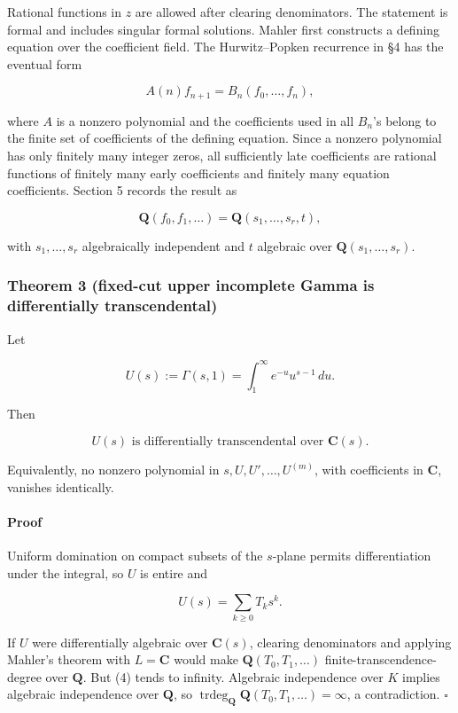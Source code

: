 Rational functions in \(z\) are allowed after clearing denominators. The
statement is formal and includes singular formal solutions. Mahler first
constructs a defining equation over the coefficient field. The
Hurwitz--Popken recurrence in §4 has the eventual form

\[
 A(n)f_{n+1}=B_n(f_0,\ldots,f_n),                                           \tag{GT-6}
\]

where \(A\) is a nonzero polynomial and the coefficients used in all
\(B_n\)'s belong to the finite set of coefficients of the defining equation.
Since a nonzero polynomial has only finitely many integer zeros, all
sufficiently late coefficients are rational functions of finitely many early
coefficients and finitely many equation coefficients. Section 5 records the
result as

\[
 \mathbf Q(f_0,f_1,\ldots)=\mathbf Q(s_1,\ldots,s_r,t),
\]

with \(s_1,\ldots,s_r\) algebraically independent and \(t\) algebraic over
\(\mathbf Q(s_1,\ldots,s_r)\).

\subsubsection{Theorem 3 (fixed-cut upper incomplete Gamma is differentially transcendental)}

Let

\[
 U(s):=\Gamma(s,1)=\int_1^\infty e^{-u}u^{s-1}\,du .
\]

Then

\[
 \boxed{U(s)\text{ is differentially transcendental over }\mathbf C(s).}    \tag{GT-7}
\]

Equivalently, no nonzero polynomial in \(s,U,U',\ldots,U^{(m)}\), with
coefficients in \(\mathbf C\), vanishes identically.

\paragraph{Proof}

Uniform domination on compact subsets of the \(s\)-plane permits
differentiation under the integral, so \(U\) is entire and

\[
 U(s)=\sum_{k\ge0}T_ks^k.                                                   \tag{GT-8}
\]

If \(U\) were differentially algebraic over \(\mathbf C(s)\), clearing
denominators and applying Mahler's theorem with \(L=\mathbf C\) would make
\(\mathbf Q(T_0,T_1,\ldots)\) finite-transcendence-degree over
\(\mathbf Q\). But (4) tends to infinity. Algebraic independence over
\(K\) implies algebraic independence over \(\mathbf Q\), so
\(\operatorname{trdeg}_{\mathbf Q}\mathbf Q(T_0,T_1,\ldots)=\infty\), a
contradiction. \(\square\)

